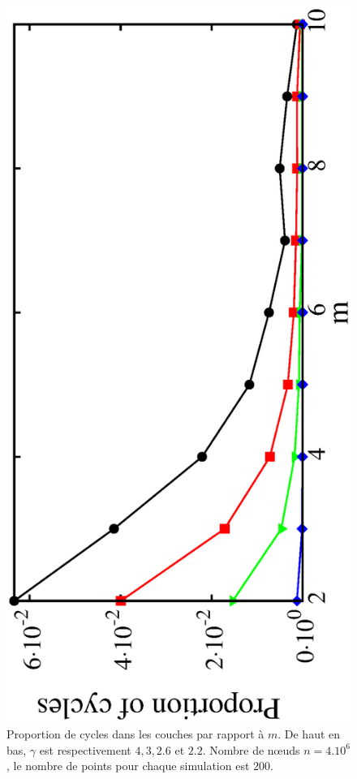 \begin{figure}[h]
	\begin{center}
		\includegraphics[angle=-90,scale=0.5]{./figures/fig3-3}
	\end{center}
	\caption{Proportion de cycles dans les couches par rapport à $ m $. De haut en bas, $ \gamma $ est respectivement $ 4, 3, 2.6 $ et $ 2.2 $. Nombre de nœuds $ n = 4.10^6 $, le nombre de points pour chaque simulation est $200 $.}
	\label{fig3-3}
\end{figure}

